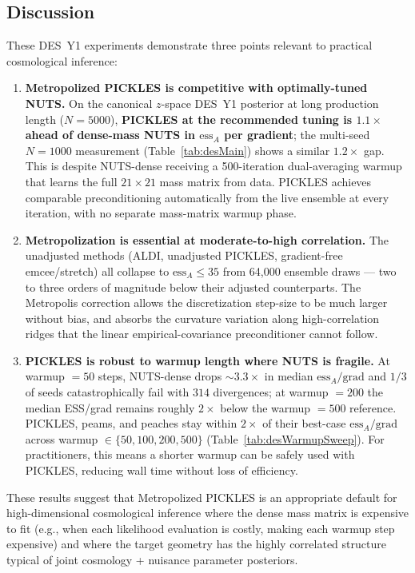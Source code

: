 \documentclass{article}
\begin{document}
\subsection{Discussion}

These DES~Y1 experiments demonstrate three points relevant to practical
cosmological inference:

\begin{enumerate}

\item \textbf{Metropolized PICKLES is competitive with optimally-tuned
NUTS.} On the canonical $z$-space DES~Y1 posterior at long production
length ($N=5000$), \textbf{PICKLES at the recommended tuning is
$1.1\times$ ahead of dense-mass NUTS in
$\mathrm{ess}_A$ per gradient}; the multi-seed $N=1000$
measurement (Table~\ref{tab:desMain}) shows a similar $1.2\times$
gap.  This is despite
NUTS-dense receiving a 500-iteration dual-averaging warmup that learns
the full $21\times 21$ mass matrix from data. PICKLES achieves
comparable preconditioning automatically from the live ensemble at every
iteration, with no separate mass-matrix warmup phase.

\item \textbf{Metropolization is essential at moderate-to-high
correlation.} The unadjusted methods (ALDI, unadjusted PICKLES,
gradient-free emcee/stretch) all collapse to $\mathrm{ess}_A\le 35$
from 64{,}000 ensemble draws --- two to three orders of magnitude
below their adjusted counterparts. The Metropolis correction allows
the discretization step-size to be much larger without bias, and
absorbs the curvature variation along high-correlation ridges that the
linear empirical-covariance preconditioner cannot follow.

\item \textbf{PICKLES is robust to warmup length where NUTS is
fragile.} At warmup $=50$ steps, NUTS-dense drops $\sim\!3.3\times$ in
median $\mathrm{ess}_A/\text{grad}$ and $1/3$ of seeds catastrophically
fail with $314$ divergences; at warmup $=200$ the median ESS/grad
remains roughly $2\!\times$ below the warmup $=500$ reference.  PICKLES,
peams, and peaches stay within $2\times$ of their best-case
$\mathrm{ess}_A/\text{grad}$ across warmup $\in\{50,100,200,500\}$
(Table~\ref{tab:desWarmupSweep}). For practitioners, this means a
shorter warmup can be safely used with PICKLES, reducing wall time
without loss of efficiency.
\end{enumerate}

These results suggest that Metropolized PICKLES is an appropriate
default for high-dimensional cosmological inference where the dense
mass matrix is expensive to fit (e.g., when each likelihood evaluation
is costly, making each warmup step expensive) and where the target
geometry has the highly correlated structure typical of joint
cosmology + nuisance parameter posteriors.
\end{document}
